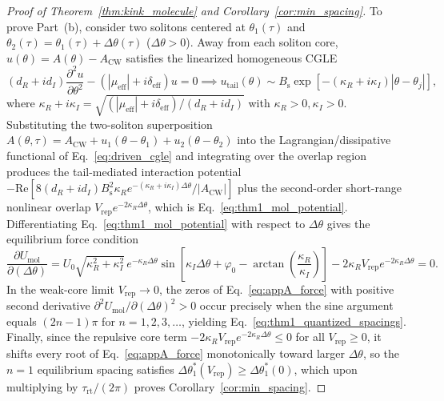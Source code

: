 \documentclass[11pt,letterpaper]{article}
\begin{document}
\begin{proof}[Proof of Theorem~\ref{thm:kink_molecule} and Corollary~\ref{cor:min_spacing}]
To prove Part~(b), consider two solitons centered at $\theta_1(\tau)$ and $\theta_2(\tau) = \theta_1(\tau) + \Delta\theta(\tau)$ ($\Delta\theta > 0$). Away from each soliton core, $u(\theta) = A(\theta) - A_{\mathrm{CW}}$ satisfies the linearized homogeneous CGLE
\begin{equation}
(d_R + i d_I)\frac{\partial^2 u}{\partial \theta^2} - \left( |\mu_{\mathrm{eff}}| + i\delta_{\mathrm{eff}} \right) u = 0 \implies u_{\mathrm{tail}}(\theta) \sim B_{\mathrm{s}} \exp\!\left[ -(\kappa_R + i\kappa_I)|\theta - \theta_j| \right],
\label{eq:appA_tail}
\end{equation}
where $\kappa_R + i\kappa_I = \sqrt{(|\mu_{\mathrm{eff}}| + i\delta_{\mathrm{eff}})/(d_R + i d_I)}$ with $\kappa_R > 0, \kappa_I > 0$. Substituting the two-soliton superposition $A(\theta, \tau) = A_{\mathrm{CW}} + u_1(\theta - \theta_1) + u_2(\theta - \theta_2)$ into the Lagrangian/dissipative functional of Eq.~\eqref{eq:driven_cgle} and integrating over the overlap region produces the tail-mediated interaction potential $-\mathrm{Re}[8(d_R + i d_I) B_{\mathrm{s}}^2 \kappa_R e^{-(\kappa_R + i\kappa_I)\Delta\theta}/|A_{\mathrm{CW}}|]$ plus the second-order short-range nonlinear overlap $V_{\mathrm{rep}}e^{-2\kappa_R \Delta\theta}$, which is Eq.~\eqref{eq:thm1_mol_potential}. Differentiating Eq.~\eqref{eq:thm1_mol_potential} with respect to $\Delta\theta$ gives the equilibrium force condition
\begin{equation}
\frac{\partial U_{\mathrm{mol}}}{\partial(\Delta\theta)} = U_0 \sqrt{\kappa_R^2 + \kappa_I^2}\,e^{-\kappa_R \Delta\theta}\sin\!\left[ \kappa_I \Delta\theta + \varphi_0 - \arctan\!\left(\frac{\kappa_R}{\kappa_I}\right) \right] - 2\kappa_R V_{\mathrm{rep}} e^{-2\kappa_R \Delta\theta} = 0.
\label{eq:appA_force}
\end{equation}
In the weak-core limit $V_{\mathrm{rep}} \to 0$, the zeros of Eq.~\eqref{eq:appA_force} with positive second derivative $\partial^2 U_{\mathrm{mol}}/\partial(\Delta\theta)^2 > 0$ occur precisely when the sine argument equals $(2n - 1)\pi$ for $n = 1, 2, 3, \dots$, yielding Eq.~\eqref{eq:thm1_quantized_spacings}. Finally, since the repulsive core term $-2\kappa_R V_{\mathrm{rep}}e^{-2\kappa_R\Delta\theta} \le 0$ for all $V_{\mathrm{rep}} \ge 0$, it shifts every root of Eq.~\eqref{eq:appA_force} monotonically toward larger $\Delta\theta$, so the $n = 1$ equilibrium spacing satisfies $\Delta\theta_1^*(V_{\mathrm{rep}}) \ge \Delta\theta_1^*(0)$, which upon multiplying by $\tau_{\mathrm{rt}}/(2\pi)$ proves Corollary~\ref{cor:min_spacing}.
\end{proof}
\end{document}
